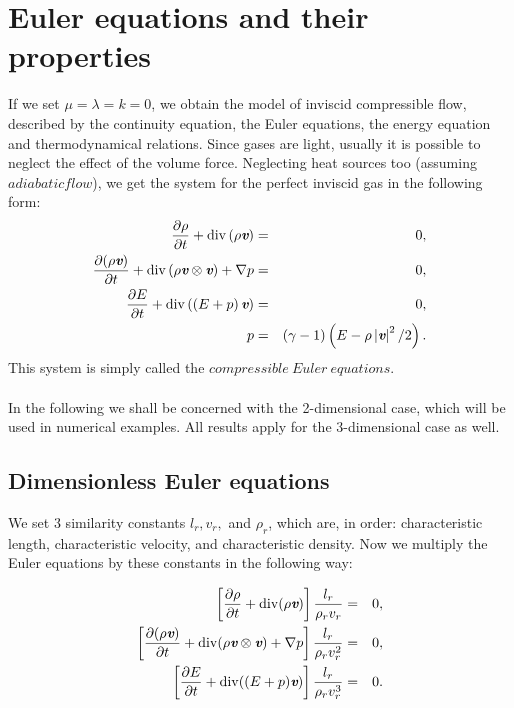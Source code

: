 \section{Euler equations and their properties}
\label{sec:euler_properties}
If we set $\mu = \lambda = k = 0$, we obtain the model of inviscid compressible flow,
described by the continuity equation, the Euler equations, the energy equation and
thermodynamical relations. Since gases are light, usually it is possible to neglect the
effect of the volume force. Neglecting heat sources too (assuming $adiabatic flow$), we get the system for the perfect inviscid gas in the following form:
\begin{eqnarray}
  \frac{\partial{\rho}}{\partial{t}} + \mathrm{div}\left(\rho\textit{\textbf{v}}\right) & = & 0,\\
  \frac{\partial{\left(\rho\textit{\textbf{v}}\right)}}{\partial{t}} + 
  \mathrm{div}\left(\rho\textit{\textbf{v}}\otimes\textit{\textbf{v}}\right)+ 
  \nabla p & = & 0,\\
  \frac{\partial{E}}{\partial{t}} + \mathrm{div}\left(\left( E+p\right)\textit{\textbf{v}}\right) & = & 0,\\
   p & = & \left(\gamma-1\right)\left({E}-\rho\left|\textit{\textbf{v}}\right|^2/2\right).
	\end{eqnarray}
This system is simply called the $compressible\ Euler\ equations$.
\paragraph{}
In the following we shall be concerned with the 2-dimensional case, which will be used in numerical examples. All results apply for the 3-dimensional case as well.

\subsection{Dimensionless Euler equations}
We set 3 similarity constants $l_r, v_r,$ and $\rho_r$, which are, in order: characteristic length, characteristic velocity, and characteristic density. Now we multiply the Euler equations by these constants in the following way:

\begin{eqnarray}
\left[{\partial\rho\over\partial t} + \mathrm{div}(\rho{\textit{\textbf{v}}})\right] {l_r\over\rho_r v_r} & = & 0,\\ \left[{\partial(\rho{\textit{\textbf{v}}})\over\partial t} + \mathrm{div}(\rho{\textit{\textbf{v}}}\otimes{\textit{\textbf{v}}}) + \nabla p\right]
{l_r\over\rho_r v_r^2} & = & 0,\\
\left[{\partial E\over\partial t} +\mathrm{div}((E+p){\textit{\textbf{v}}})\right] {l_r\over\rho_r v_r^3} & = & 0.
\end{eqnarray}

